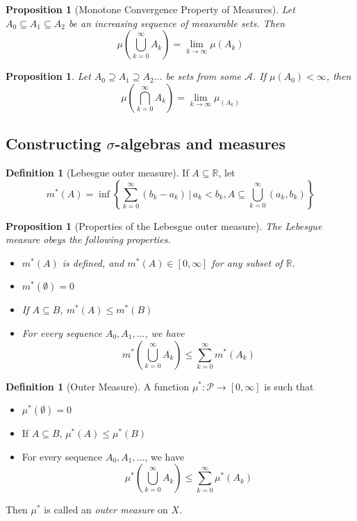 \documentclass[10pt, oneside, reqno]{amsart}
\theoremstyle{plain}%
\newtheorem{prop}[thm]{Proposition}
\theoremstyle{definition}
\newtheorem{defn}[thm]{Definition}
\theoremstyle{remark}
\newcommand{\given}{ \, | \,}
\newcommand{\R}{\mathbb{R}}
\begin{document}
\begin{prop}[Monotone Convergence Property of Measures]
    Let $A_0 \subseteq A_1 \subseteq A_2$ be an increasing sequence of measurable sets.  Then \[
        \mu(\bigcup_{k=0}^\infty A_k) = \lim_{k \rightarrow \infty} \mu(A_k)
    \]
\end{prop}

\begin{prop}
    Let $A_0 \supseteq A_1 \supseteq A_2 \dots$ be sets from some \sig $\mathcal{A}$.  If $\mu(A_0) < \infty$, then 
    \[
    \mu(\bigcap_{k = 0}^\infty A_k) = \lim_{k \rightarrow \infty} \mu_(A_k)
    \]
\end{prop}


\subsection{Constructing $\sigma$-algebras and measures} %
\label{sub:constructing_sigma_algebras_and_measures}
\begin{defn}[Lebesgue outer measure]
    If $A \subseteq \R$, let \[
        m^*(A) = \inf \left\{ \sum_{k=0}^\infty (b_k - a_k) \given a_k < b_k, A \subseteq \bigcup_{k=0}^\infty (a_k, b_k) \right\}
    \]
\end{defn}

\begin{prop}[Properties of the Lebesgue outer measure]
    The Lebesgue measure obeys the following properties.
    \begin{itemize}
        \item $m^*(A)$ is defined, and $m^*(A) \in [0,\infty]$ for any subset of $\R$.
        \item $m^*(\emptyset) = 0$
        \item If $A \subseteq B$, $m^*(A) \leq m^*(B)$
        \item For every sequence $A_0, A_1,\dots$, we have \[
            m^*(\bigcup_{k=0}^\infty A_k) \leq \sum_{k=0}^\infty m^*(A_k)
        \]
    \end{itemize}
\end{prop}

\begin{defn}[Outer Measure]
    A function $\mu^* : \mathcal{P} \rightarrow [0,\infty]$ is such that 
    \begin{itemize}
        \item $\mu^*(\emptyset) = 0$
        \item If $A \subseteq B$, $\mu^*(A) \leq \mu^*(B)$
        \item For every sequence $A_0, A_1,\dots$, we have \[
            \mu^*(\bigcup_{k=0}^\infty A_k) \leq \sum_{k=0}^\infty \mu^*(A_k)
        \]
    \end{itemize} 
    Then $\mu^*$ is called an \emph{outer measure} on $X$.
\end{defn}
\end{document}
